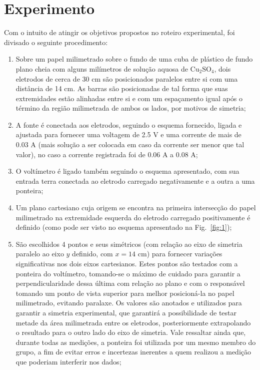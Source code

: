 \section{Experimento}
Com o intuito de atingir os objetivos propostos no roteiro experimental, foi divisado o seguinte procedimento:
\begin{enumerate}
    \item Sobre um papel milimetrado sobre o fundo de uma cuba de plástico de fundo plano cheia com alguns milímetros de solução aquosa de $\text{Cu}_2\text{SO}_4$, dois eletrodos de cerca de 30 cm são posicionados paralelos entre si com uma distância de 14 cm. As barras são posicionadas de tal forma que suas extremidades estão alinhadas entre si e com um espaçamento igual após o término da região milimetrada de ambos os lados, por motivos de simetria;
    \item A fonte é conectada aos eletrodos, seguindo o esquema fornecido, ligada e ajustada para fornecer uma voltagem de 2.5 V e uma corrente de mais de 0.03 A (mais solução a ser colocada em caso da corrente ser menor que tal valor), no caso a corrente registrada foi de 0.06 A a 0.08 A;
    \item O voltímetro é ligado também seguindo o esquema apresentado, com sua entrada terra conectada ao eletrodo carregado negativamente e a outra a uma ponteira;
    \item Um plano cartesiano cuja origem se encontra na primeira intersecção do papel milimetrado na extremidade esquerda do eletrodo carregado positivamente é definido (como pode ser visto no esquema apresentado na Fig.~\ref{fig:1});
    \item São escolhidos 4 pontos e seus simétricos (com relação ao eixo de simetria paralelo ao eixo $y$ definido, com $x=14$ cm) para fornecer variações significativas nos dois eixos cartesianos. Estes pontos são testados com a ponteira do voltímetro, tomando-se o máximo de cuidado para garantir a perpendicularidade dessa última com relação ao plano e com o responsável tomando um ponto de vista superior para melhor posicioná-la no papel milimetrado, evitando paralaxe. Os valores são anotados e utilizados para garantir a simetria experimental, que garantirá a possibilidade de testar metade da área milimetrada entre os eletrodos, posteriormente extrapolando o resultado para o outro lado do eixo de simetria. Vale ressaltar ainda que, durante todas as medições, a ponteira foi utilizada por um mesmo membro do grupo, a fim de evitar erros e incertezas inerentes a quem realizou a medição que poderiam interferir nos dados;

\end{enumerate}
